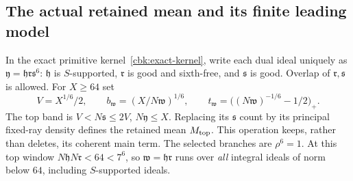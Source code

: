 \subsection{The actual retained mean and its finite leading model}
\label{gtl:mean}
In the exact primitive kernel~\eqref{cbk:exact-kernel}, write each
dual ideal uniquely as $\mathfrak y=\mathfrak h\mathfrak r\mathfrak s^6$:
$\mathfrak h$ is $S$-supported, $\mathfrak r$ is good and sixth-free,
and $\mathfrak s$ is good. Overlap of $\mathfrak r,\mathfrak s$
is allowed. For $X\ge64$ set
\begin{equation}\label{gtl:top-window}
 V=X^{1/6}/2,\qquad
 b_{\mathfrak w}=(X/N\mathfrak w)^{1/6},\qquad
 t_{\mathfrak w}=\bigl((N\mathfrak w)^{-1/6}-1/2\bigr)_+ .
\end{equation}
The top band is $V<N\mathfrak s\le2V$, $N\mathfrak y\le X$.
Replacing its $\mathfrak s$ count by its principal fixed-ray
density defines the retained mean $M_{\rm top}$. This operation
keeps, rather than deletes, its coherent main term.
The selected branches are $\rho^6=1$. At this top window
$N\mathfrak hN\mathfrak r<64<7^6$, so
$\mathfrak w=\mathfrak h\mathfrak r$ runs over \emph{all} integral
ideals of norm below $64$, including $S$-supported ideals.

